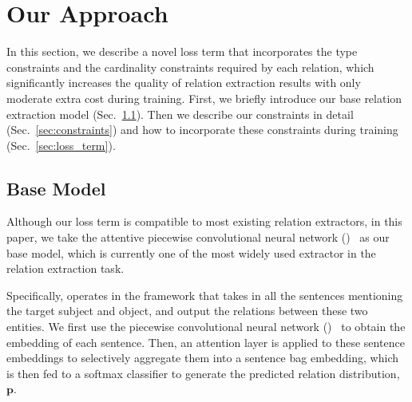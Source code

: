 \section{Our Approach}
In this section, we describe a novel loss term that incorporates the type constraints and the cardinality constraints required by each relation,
which significantly increases the quality of relation extraction results with only moderate extra cost during training.
First, we briefly introduce our base relation extraction model (Sec.~\ref{sec:base_model}).
Then we describe our constraints in detail (Sec.~\ref{sec:constraints}) and how to incorporate these constraints during training (Sec.~\ref{sec:loss_term}).





\subsection{Base Model}
\label{sec:base_model}
Although our loss term is compatible to most existing relation extractors, in this paper, we take the attentive piecewise convolutional neural network (\APCNN)~\cite{lin2016neural} as our base model, which is currently one of the most widely used extractor in the relation extraction task.

Specifically, \APCNN operates in the \MIL framework that takes in all the sentences mentioning the target subject and object, and output the relations between these two entities.
We first use the piecewise convolutional neural network (\PCNN)~\cite{zeng2015distant} to obtain the embedding of each sentence.
Then, an attention layer is applied to these sentence embeddings to selectively aggregate them into a sentence bag embedding, which is then fed to a softmax classifier to generate the predicted relation distribution, $\bm{p}$.




